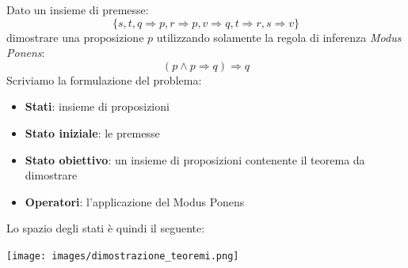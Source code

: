 \begin{example}
	Dato un insieme di premesse:
	\begin{equation}
		\{s, t, q \Rightarrow p, r \Rightarrow p, v \Rightarrow q, t \Rightarrow r, s \Rightarrow v\}
	\end{equation}
	dimostrare una proposizione $p$ utilizzando solamente la regola di inferenza \emph{Modus Ponens}:
	\begin{equation*}
		(p \wedge p\Rightarrow q) \Rightarrow q
	\end{equation*}
	Scriviamo la formulazione del problema:
	\begin{itemize}
		\item \textbf{Stati}: insieme di proposizioni
		\item \textbf{Stato iniziale}: le premesse
		\item \textbf{Stato obiettivo}: un insieme di proposizioni contenente il teorema da dimostrare
		\item \textbf{Operatori}: l'applicazione del Modus Ponens
	\end{itemize}
	Lo spazio degli stati è quindi il seguente:
	\begin{center}
		\texttt{[image: images/dimostrazione\_teoremi.png]}
	\end{center}
\end{example}

